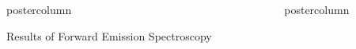 \documentclass[10pt,papersize={24in,36in}]{beamer}
\newlength{\columnheight}
\begin{document}
\begin{frame}
\begin{columns}
\begin{column}{.49\textwidth}
\begin{beamercolorbox}[center,wd=\textwidth]{postercolumn}
\begin{minipage}[T]{.95\textwidth}
{\begin{block}{Results of Forward Emission Spectroscopy}
            \end{block}
			\vspace{2cm}
          }
        \end{minipage}
      \end{beamercolorbox}
    \end{column}
    \begin{column}{.49\textwidth}
      \begin{beamercolorbox}[center,wd=\textwidth]{postercolumn}
        \begin{minipage}[T]{.95\textwidth} %
          \parbox[t][\columnheight]{\textwidth}{
}
\end{minipage}
\end{beamercolorbox}
\end{column}
\end{columns}
\end{frame}
\end{document}

